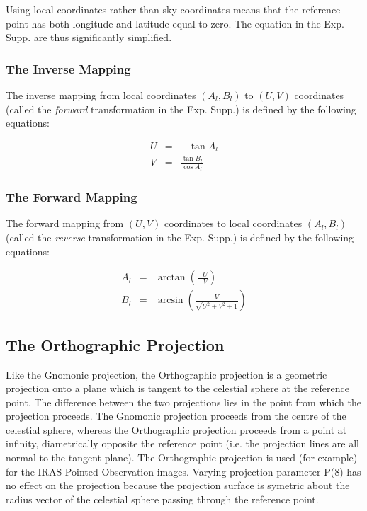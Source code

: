 Using local coordinates rather than sky coordinates means that the reference
point has both longitude and latitude equal to zero. The equation in the Exp.
Supp. are thus significantly simplified. 

\subsubsection {The Inverse Mapping}
The inverse mapping from local coordinates $(A_{l},B_{l})$ to $(U,V)$
coordinates (called the {\em forward} transformation in the Exp. Supp.) is
defined by the following equations: 

\begin{eqnarray*}
U & = & -\tan A_{l}\\
V & = & \frac{\tan B_{l}}{\cos A_{l}}
\end{eqnarray*}

\subsubsection {The Forward Mapping}
The forward mapping from $(U,V)$ coordinates to local coordinates
$(A_{l},B_{l})$ (called the {\em reverse} transformation in the Exp. Supp.) is
defined by the following equations: 

\begin{eqnarray*}
A_{l} & = & \arctan \left( \frac{-U}{-V} \right)\\
B_{l} & = & \arcsin \left(\frac{V}{\sqrt{U^{2}+V^{2}+1}} \right) 
\end{eqnarray*}

\subsection {The Orthographic Projection}
Like the Gnomonic projection, the Orthographic projection is a geometric
projection onto a plane which is tangent to the celestial sphere at the
reference point. The difference between the two projections lies in the point
from which the projection proceeds. The Gnomonic projection proceeds from the
centre of the celestial sphere, whereas the Orthographic projection proceeds
from a point at infinity, diametrically opposite the reference point (i.e. the
projection lines are all normal to the tangent plane). The Orthographic
projection is used (for example) for the IRAS Pointed Observation images. 
Varying projection parameter P(8) has no effect on the projection because the
projection surface is symetric about the radius vector of the celestial sphere
passing through the reference point. 

